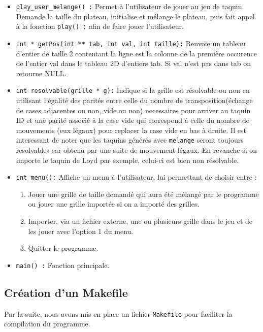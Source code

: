 \documentclass{article}
\begin{document}
\begin{itemize}
 \item \texttt{play\_user\_melange() :} Permet à l'utilisateur de jouer au jeu de taquin. Demande la taille du plateau, initialise et mélange le plateau, puis fait appel à la fonction \texttt{play() :} afin de faire jouer l'utilisateur.
 \item \texttt{int * getPos(int  ** tab, int val, int taille):} Renvoie un tableau d'entier de taille 2 contentant la ligne est la colonne de la première occurence de l'entier val dans le tableau 2D d'entiers tab. Si val n'est pas dans tab on retourne NULL.
 \item \texttt{int resolvable(grille * g):} Indique si la grille est résolvable ou non en utilisant l'égalité des parités entre celle du nombre de transposition(échange de cases adjacentes ou non, vide ou non) necessaires pour arriver au taquin ID et une parité associé à la case vide qui correspond à celle du nombre de mouvements (eux légaux) pour replacer la case vide en bas à droite. Il est interessant de noter que les taquins générés avec \texttt{melange} seront toujours resolvables car obtenu par une suite de mouvement légaux. En revanche si on importe le taquin de Loyd par exemple, celui-ci est bien non résolvable.
 \item \texttt{int menu():} Affiche un menu à l'utilisateur, lui permettant de choisir entre :
  
 \begin{enumerate}
 \item Jouer une grille de taille demandé qui aura été mélangé par le programme ou jouer une grille importée si on a importé des grilles.
 \item Importer, via un fichier externe, une ou plusieurs grille dans le jeu et de les jouer avec l'option 1 du menu. 
 \item Quitter le programme.
 \end{enumerate}   
 
 \item \texttt{main() :} Fonction principale.
 
\end{itemize}

\subsection{Création d'un Makefile}
Par la suite, nous avons mis en place un fichier \texttt{Makefile} pour faciliter la compilation du programme.\\
\end{document}
